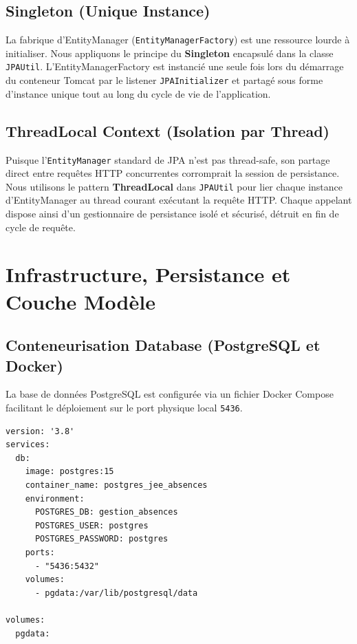 \documentclass[12pt,a4paper]{article}
\begin{document}
\subsection{Singleton (Unique Instance)}
La fabrique d'EntityManager (\texttt{EntityManagerFactory}) est une ressource lourde à initialiser. Nous appliquons le principe du \textbf{Singleton} encapsulé dans la classe \texttt{JPAUtil}. L'EntityManagerFactory est instancié une seule fois lors du démarrage du conteneur Tomcat par le listener \texttt{JPAInitializer} et partagé sous forme d'instance unique tout au long du cycle de vie de l'application.

\subsection{ThreadLocal Context (Isolation par Thread)}
Puisque l'\texttt{EntityManager} standard de JPA n'est pas thread-safe, son partage direct entre requêtes HTTP concurrentes corromprait la session de persistance. Nous utilisons le pattern \textbf{ThreadLocal} dans \texttt{JPAUtil} pour lier chaque instance d'EntityManager au thread courant exécutant la requête HTTP. Chaque appelant dispose ainsi d'un gestionnaire de persistance isolé et sécurisé, détruit en fin de cycle de requête.

\newpage

\section{Infrastructure, Persistance et Couche Modèle}

\subsection{Conteneurisation Database (PostgreSQL et Docker)}
La base de données PostgreSQL est configurée via un fichier Docker Compose facilitant le déploiement sur le port physique local \texttt{5436}.

\begin{lstlisting}[language=XML, caption={Fichier docker-compose.yml}]
version: '3.8'
services:
  db:
    image: postgres:15
    container_name: postgres_jee_absences
    environment:
      POSTGRES_DB: gestion_absences
      POSTGRES_USER: postgres
      POSTGRES_PASSWORD: postgres
    ports:
      - "5436:5432"
    volumes:
      - pgdata:/var/lib/postgresql/data

volumes:
  pgdata:
\end{lstlisting}
\end{document}
